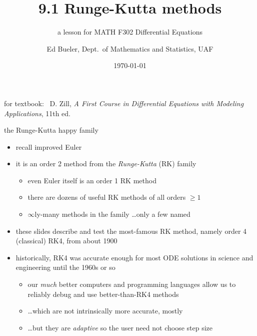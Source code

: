 \documentclass[urlcolor=blue,dvipsnames]{beamer}
\title{9.1 Runge-Kutta methods}
\subtitle{a lesson for MATH F302 Differential Equations}
\author{Ed Bueler, Dept.~of Mathematics and Statistics, UAF}
\date{\tiny \today}
\begin{document}
\renewcommand{\thefootnote}{{\color{green} \arabic{footnote}}}

\begin{frame}
\titlepage

\centerline{\tiny for textbook: \, D. Zill, \emph{A First Course in Differential Equations with Modeling Applications}, 11th ed.}
\end{frame}


\begin{frame}{the Runge-Kutta happy family}

\begin{itemize}
\item recall improved Euler
\item it is an order 2 method from the \emph{Runge-Kutta} (RK) family
    \begin{itemize}
    \item even Euler itself is an order 1 RK method
    \item there are dozens of useful RK methods of all orders $\ge 1$
    \item $\infty$ly-many methods in the family \dots only a few named
    \end{itemize}
\item these slides describe and test the most-famous RK method, namely \alert{order 4 (classical) RK4}, from about 1900
\item historically, RK4 was accurate enough for most ODE solutions in science and engineering until the 1960s or so
    \begin{itemize}
    \item our \emph{much} better computers and programming languages allow us to reliably debug and use better-than-RK4 methods
    \item \dots which are not intrinsically more accurate, mostly
    \item \dots but they are \emph{adaptive} so the user need not choose step size
    \end{itemize}
\end{itemize}
\end{frame}
\end{document}
